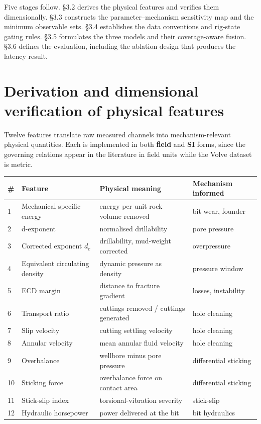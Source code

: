 \documentclass[12pt,a4paper]{report}
\begin{document}
Five stages follow. §3.2 derives the physical features and verifies them dimensionally. §3.3 constructs the
parameter--mechanism sensitivity map and the minimum observable sets. §3.4 establishes the data conventions
and rig-state gating rules. §3.5 formulates the three models and their coverage-aware fusion. §3.6 defines
the evaluation, including the ablation design that produces the latency result.

\section{Derivation and dimensional verification of physical features}

Twelve features translate raw measured channels into mechanism-relevant physical quantities. Each is
implemented in both \textbf{field} and \textbf{SI} forms, since the governing relations appear in the literature in
field units while the Volve dataset is metric.

\begin{center}\small
\begin{tabular}{llll}
\toprule
# & Feature & Physical meaning & Mechanism informed \\
\midrule
1 & Mechanical specific energy & energy per unit rock volume removed & bit wear, founder \\
2 & d-exponent & normalised drillability & pore pressure \\
3 & Corrected exponent $d_c$ & drillability, mud-weight corrected & overpressure \\
4 & Equivalent circulating density & dynamic pressure as density & pressure window \\
5 & ECD margin & distance to fracture gradient & losses, instability \\
6 & Transport ratio & cuttings removed / cuttings generated & hole cleaning \\
7 & Slip velocity & cutting settling velocity & hole cleaning \\
8 & Annular velocity & mean annular fluid velocity & hole cleaning \\
9 & Overbalance & wellbore minus pore pressure & differential sticking \\
10 & Sticking force & overbalance force on contact area & differential sticking \\
11 & Stick-slip index & torsional-vibration severity & stick-slip \\
12 & Hydraulic horsepower & power delivered at the bit & bit hydraulics \\
\bottomrule
\end{tabular}\end{center}
\end{document}
